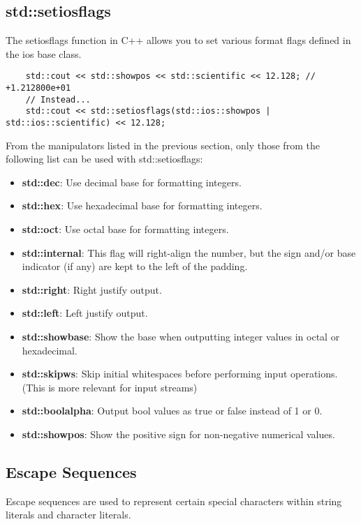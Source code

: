 \documentclass{report}
\begin{document}
    \pagebreak \bigbreak \noindent 
    \subsection{std::setiosflags}
    The setiosflags function in C++ allows you to set various format flags defined in the ios base class. 
    \bigbreak \noindent 
    \sepline
    \begin{verbatim}
    std::cout << std::showpos << std::scientific << 12.128; // +1.212800e+01
    // Instead...
    std::cout << std::setiosflags(std::ios::showpos | std::ios::scientific) << 12.128; 
    \end{verbatim}
    \sepline
    \bigbreak \noindent 
    From the manipulators listed in the previous section, only those from the following list can be used with std::setiosflags:
    \begin{itemize}
        \item \textbf{std::dec}: Use decimal base for formatting integers.
        \item \textbf{std::hex}: Use hexadecimal base for formatting integers.
        \item \textbf{std::oct}: Use octal base for formatting integers.
        \item \textbf{std::internal}: This flag will right-align the number, but the sign and/or base indicator (if any) are kept to the left of the padding.
        \item \textbf{std::right}: Right justify output.
        \item \textbf{std::left}: Left justify output.
        \item \textbf{std::showbase}: Show the base when outputting integer values in octal or hexadecimal.
        \item \textbf{std::skipws}: Skip initial whitespaces before performing input operations. (This is more relevant for input streams)
        \item \textbf{std::boolalpha}: Output bool values as true or false instead of 1 or 0.
        \item \textbf{std::showpos}: Show the positive sign for non-negative numerical values.
    \end{itemize}

    \bigbreak \noindent 
    \subsection{Escape Sequences}
    \bigbreak \noindent 
    Escape sequences are used to represent certain special characters within string literals and character literals.
    \bigbreak \noindent 
\end{document}
